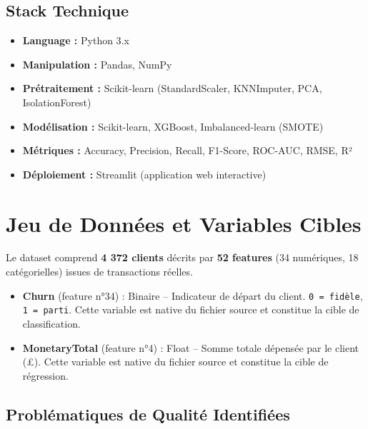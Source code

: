 \documentclass[11pt,a4paper]{article}
\begin{document}
\subsection{Stack Technique}

\begin{itemize}[label=\color{headerblue}$\bullet$]
    \item \textbf{Language :} Python 3.x
    \item \textbf{Manipulation :} Pandas, NumPy
    \item \textbf{Prétraitement :} Scikit-learn (StandardScaler, KNNImputer, PCA, IsolationForest)
    \item \textbf{Modélisation :} Scikit-learn, XGBoost, Imbalanced-learn (SMOTE)
    \item \textbf{Métriques :} Accuracy, Precision, Recall, F1-Score, ROC-AUC, RMSE, R²
    \item \textbf{Déploiement :} Streamlit (application web interactive)
\end{itemize}

\section{Jeu de Données et Variables Cibles}

Le dataset comprend \textbf{4 372 clients} décrits par \textbf{52 features} (34 numériques, 18 catégorielles) issues de transactions réelles.

\begin{tcolorbox}[colframe=headerblue, title=Variables Cibles (fournies dans le dataset)]
\begin{itemize}
    \item \textbf{Churn} (feature n°34) : Binaire -- Indicateur de départ du client. \texttt{0 = fidèle}, \texttt{1 = parti}. Cette variable est native du fichier source et constitue la cible de classification.
    \item \textbf{MonetaryTotal} (feature n°4) : Float -- Somme totale dépensée par le client (£). Cette variable est native du fichier source et constitue la cible de régression.
\end{itemize}
\end{tcolorbox}

\subsection{Problématiques de Qualité Identifiées}
\end{document}

